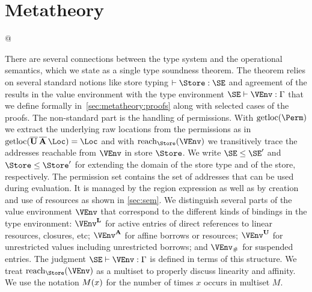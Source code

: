 \section{Metatheory}
\label{sec:metatheory}

\lstMakeShortInline[style=rule]@

There are several connections between the type system and
the operational semantics, which we state as a single type soundness
theorem.
%
The theorem relies on several standard notions like store typing
$\vdash \Store : \SE$ and agreement of the results in the value environment
with the type environment $\SE \vdash \VEnv:\E$ that we define
formally in~\cref{sec:metatheory:proofs} along with selected cases of the
proofs.
%
The non-standard part is the handling of permissions. With
$\Rawloc\Perm$ we extract the underlying raw locations from the
permissions as in $\Rawloc{\Multi\IBORROW\hspace{0.5mm}\Multi\MBORROW\hspace{0.5mm}\Loc} = \Loc$
and with $\Reach\Store\VEnv$ we transitively trace the
addresses reachable from $\VEnv$ in store $\Store$. We write
$\SE\le\SE'$ and $\Store \le \Store'$ for extending the domain of the
store type and of the store, respectively.
%
The permission set contains the set
of addresses that can be used during evaluation. It is managed by the
region expression as well as by creation and use of resources as
shown in \cref{sec:sem}.
%
We distinguish several parts of the value
environment $\VEnv$ that correspond to the different kinds of bindings in the
type environment: $\Active\VEnv$ for active entries of direct
references to linear resources, closures, etc; $\MutableBorrows\VEnv$ for
affine borrows or resources;
$\ImmutableBorrows\VEnv$ for unrestricted values including
unrestricted borrows;
and $\Suspended\VEnv$ for suspended entries. The judgment
$\SE \vdash \VEnv:\E$ is defined in terms of this structure.
We treat
$\Reach\Store\VEnv$ as a multiset to properly discuss linearity and
affinity. We use the notation $\MultiNumber x M$ for the number of
times $x$ occurs in multiset $M$.

